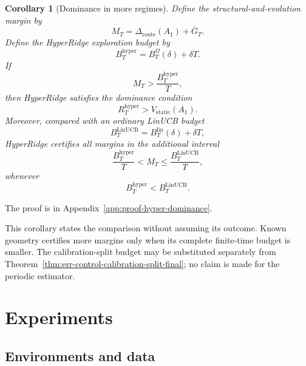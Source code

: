 \documentclass{article} %
\newtheorem{corollary}[theorem]{Corollary}
\begin{document}
\begin{corollary}[Dominance in more regimes]
\label{cor:hyper-dominance}
Define the structural-and-evolution margin by
\begin{equation}
\label{eq:hyper-margin}
M_T
=
\Delta_{\mathrm{route}}(A_1)+\bar G_T.
\end{equation}
Define the HyperRidge exploration budget by
\begin{equation}
\label{eq:hyper-budget}
B_T^{\mathrm{hyper}}
=
B_T^\Omega(\delta)+\delta T.
\end{equation}
If
\begin{equation}
\label{eq:hyper-dom-condition}
M_T
>
\frac{B_T^{\mathrm{hyper}}}{T},
\end{equation}
then HyperRidge satisfies the dominance condition
\begin{equation}
\label{eq:hyper-dom-reward}
R_T^{\mathrm{hyper}}
>
V_{\mathrm{static}}(A_1).
\end{equation}
Moreover, compared with an ordinary LinUCB budget
\begin{equation}
\label{eq:hyper-linucb-budget}
B_T^{\mathrm{LinUCB}}
=
B_T^{\mathrm{lin}}(\delta)+\delta T,
\end{equation}
HyperRidge certifies all margins in the additional interval
\begin{equation}
\label{eq:hyper-new-regime}
\frac{B_T^{\mathrm{hyper}}}{T}
<
M_T
\le
\frac{B_T^{\mathrm{LinUCB}}}{T},
\end{equation}
whenever
\begin{equation}
\label{eq:hyper-budget-order}
B_T^{\mathrm{hyper}}
<
B_T^{\mathrm{LinUCB}}.
\end{equation}
\end{corollary}

The proof is in Appendix~\ref{app:proof-hyper-dominance}.

This corollary states the comparison without assuming its outcome. Known geometry certifies more margins only when its complete finite-time budget is smaller. The calibration-split budget may be substituted separately from Theorem~\ref{thm:err-control-calibration-split-final}; no claim is made for the periodic estimator.

\section{Experiments}

\label{sec:experiments}

\subsection{Environments and data}
\end{document}
